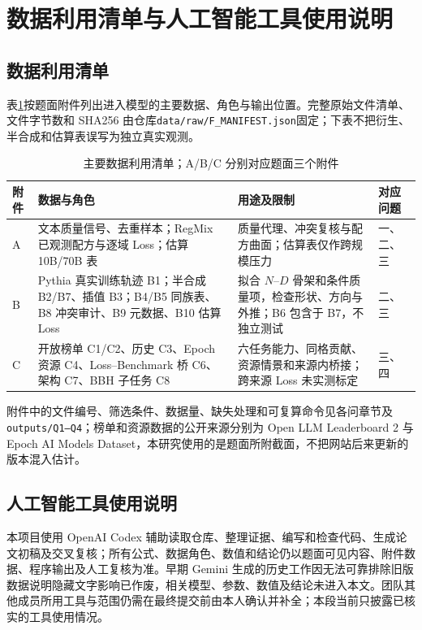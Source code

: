 \section{数据利用清单与人工智能工具使用说明}
\subsection{数据利用清单}
表\ref{tab:data-use-list}按题面附件列出进入模型的主要数据、角色与输出位置。完整原始文件清单、文件字节数和 SHA256 由仓库\texttt{data/raw/F\_MANIFEST.json}固定；下表不把衍生、半合成和估算表误写为独立真实观测。
\begin{table}[htbp]\centering\small
\caption{主要数据利用清单；A/B/C 分别对应题面三个附件}
\label{tab:data-use-list}
\begin{tabular}{p{}p{}p{}p{}}\toprule
附件 & 数据与角色 & 用途及限制 & 对应问题\\\midrule
A & 文本质量信号、去重样本；RegMix 已观测配方与逐域 Loss；估算 10B/70B 表 & 质量代理、冲突复核与配方曲面；估算表仅作跨规模压力 & 一、二、三\\
B & Pythia 真实训练轨迹 B1；半合成 B2/B7、插值 B3；B4/B5 同族表、B8 冲突审计、B9 元数据、B10 估算 Loss & 拟合 $N$--$D$ 骨架和条件质量项，检查形状、方向与外推；B6 包含于 B7，不独立测试 & 二、三\\
C & 开放榜单 C1/C2、历史 C3、Epoch 资源 C4、Loss--Benchmark 桥 C6、架构 C7、BBH 子任务 C8 & 六任务能力、同格贡献、资源情景和来源内桥接；跨来源 Loss 未实测标定 & 三、四\\
\bottomrule\end{tabular}
\end{table}
附件中的文件编号、筛选条件、数据量、缺失处理和可复算命令见各问章节及\texttt{outputs/Q1--Q4}；榜单和资源数据的公开来源分别为 Open LLM Leaderboard 2\cite{openllmv2} 与 Epoch AI Models Dataset\cite{epochmodels}，本研究使用的是题面所附截面，不把网站后来更新的版本混入估计。

\subsection{人工智能工具使用说明}
本项目使用 OpenAI Codex 辅助读取仓库、整理证据、编写和检查代码、生成论文初稿及交叉复核；所有公式、数据角色、数值和结论仍以题面可见内容、附件数据、程序输出及人工复核为准。早期 Gemini 生成的历史工作因无法可靠排除旧版数据说明隐藏文字影响已作废，相关模型、参数、数值及结论未进入本文。团队其他成员所用工具与范围仍需在最终提交前由本人确认并补全；本段当前只披露已核实的工具使用情况。
